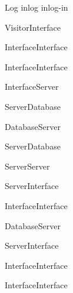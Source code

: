 \begin{sdfig}{Log in}{log in}{log-in}

  \begin{umlcall}[op={Log in}]{Visitor}{Interface}
    \begin{umlcall}[op={Validate}]{Interface}{Interface}
      \begin{umlfragment}[type=alt, label=valid]
        \begin{umlcall}[op={Set loading}]{Interface}{Interface}
          \begin{umlcall}[op={Log in}]{Interface}{Server}
            \begin{umlcall}[op={Has user}]{Server}{Database}
              \begin{umlfragment}[type=alt, label=true]
                \begin{umlcall}[type=return,op={Yes}]{Database}{Server}
                  \begin{umlcall}[op={Create OTP}]{Server}{Database}
                    \begin{umlcall}[op={Send email}]{Server}{Server}
                      \begin{umlcall}[type=return,op={Ok}]{Server}{Interface}
                        \begin{umlcall}[op={Show success}]{Interface}{Interface}
                        \end{umlcall}
                      \end{umlcall}
                    \end{umlcall}
                  \end{umlcall}
                \end{umlcall}
                \umlfpart[else]
                \begin{umlcall}[type=return,op={No}]{Database}{Server}
                  \begin{umlcall}[type=return,op={Error}]{Server}{Interface}
                    \begin{umlcall}[op={Show error}]{Interface}{Interface}
                    \end{umlcall}
                  \end{umlcall}
                \end{umlcall}
              \end{umlfragment}
            \end{umlcall}
          \end{umlcall}
        \end{umlcall}
        \umlfpart[else]
        \begin{umlcall}[op={Show error}]{Interface}{Interface}
        \end{umlcall}
      \end{umlfragment}
    \end{umlcall}
  \end{umlcall}
\end{sdfig}


